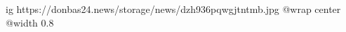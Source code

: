  
 
 
 
 

\ifcmt
  ig https://donbas24.news/storage/news/dzh936pqwgjtntmb.jpg
  @wrap center
  @width 0.8
\fi
